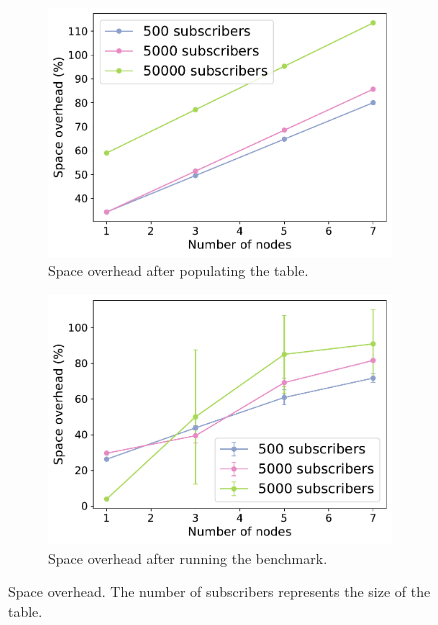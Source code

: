 \begin{figure}[htp]
  \centering
  \begin{subfigure}[t]{0.49\columnwidth}
    \centering
    \includegraphics[width=\columnwidth]{figures/space_overhead_populate.pdf}
    \caption{Space overhead after populating the table.}
    \label{fig:space overhead populate}
  \end{subfigure}
  \begin{subfigure}[t]{0.49\columnwidth}
    \centering
    \includegraphics[width=\columnwidth]{figures/space_overhead_runtime.pdf}
    \caption{Space overhead after running the benchmark.}
    \label{fig:space overhead runtime}
  \end{subfigure}
  \caption{Space overhead. The number of subscribers represents the size of the
  table.}

\end{figure}


